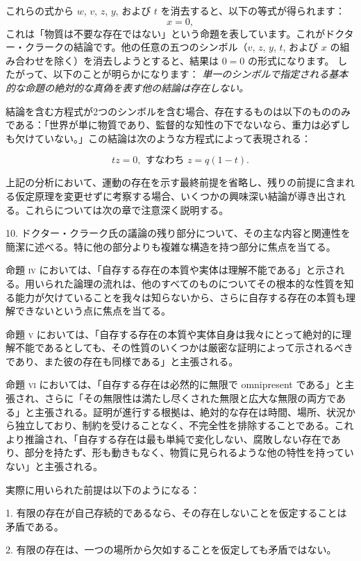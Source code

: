 \documentclass[a4paper,11pt,openany]{ltjsbook}
\begin{document}
これらの式から $w$, $v$, $z$, $y$, および $t$ を消去すると、以下の等式が得られます：
\[ x = 0, \]
これは「物質は不要な存在ではない」という命題を表しています。これがドクター・クラークの結論です。他の任意の五つのシンボル（$v$, $z$, $y$, $t$, および $x$ の組み合わせを除く）を消去しようとすると、結果は $0=0$ の形式になります。
したがって、以下のことが明らかになります：
\textit{単一のシンボルで指定される基本的な命題の絶対的な真偽を表す他の結論は存在しない。}

結論を含む方程式が2つのシンボルを含む場合、存在するものは以下のもののみである：「世界が単に物質であり、監督的な知性の下でないなら、重力は必ずしも欠けていない。」この結論は次のような方程式によって表現される：

\[tz = 0, \textrm{ すなわち } z = q (1 - t).\]

上記の分析において、運動の存在を示す最終前提を省略し、残りの前提に含まれる仮定原理を変更せずに考察する場合、いくつかの興味深い結論が導き出される。これらについては次の章で注意深く説明する。

10. ドクター・クラーク氏の議論の残り部分について、その主な内容と関連性を簡潔に述べる。特に他の部分よりも複雑な構造を持つ部分に焦点を当てる。

命題 \textsc{iv} においては、「自存する存在の本質や実体は理解不能である」と示される。用いられた論理の流れは、他のすべてのものについてその根本的な性質を知る能力が欠けていることを我々は知らないから、さらに自存する存在の本質も理解できないという点に焦点を当てる。

命題 \textsc{v} においては、「自存する存在の本質や実体自身は我々にとって絶対的に理解不能であるとしても、その性質のいくつかは厳密な証明によって示されるべきであり、また彼の存在も同様である」と主張される。

命題 \textsc{vi} においては、「自存する存在は必然的に無限で omnipresent である」と主張され、さらに「その無限性は満たし尽くされた無限と広大な無限の両方である」と主張される。証明が進行する根拠は、絶対的な存在は時間、場所、状況から独立しており、制約を受けることなく、不完全性を排除することである。これより推論され、「自存する存在は最も単純で変化しない、腐敗しない存在であり、部分を持たず、形も動きもなく、物質に見られるような他の特性を持っていない」と主張される。

実際に用いられた前提は以下のようになる：

1. 有限の存在が自己存続的であるなら、その存在しないことを仮定することは矛盾である。

2. 有限の存在は、一つの場所から欠如することを仮定しても矛盾ではない。
\end{document}
